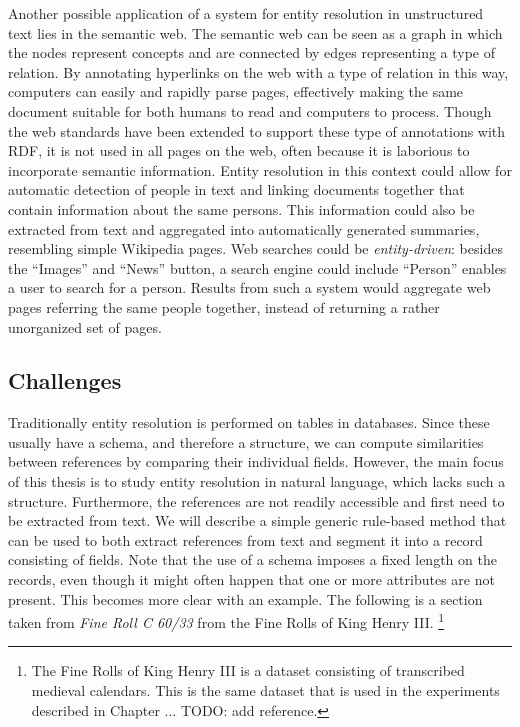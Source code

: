 Another possible application of a system for entity resolution in unstructured text lies in the semantic web.
The semantic web can be seen as a graph in which the nodes represent concepts and are connected by edges representing a type of relation.
By annotating hyperlinks on the web with a type of relation in this way, computers can easily and rapidly parse pages, effectively making the same document suitable for both humans to read and computers to process.
Though the web standards have been extended to support these type of annotations with RDF, it is not used in all pages on the web, often because it is laborious to incorporate semantic information.
Entity resolution in this context could allow for automatic detection of people in text and linking documents together that contain information about the same persons.
This information could also be extracted from text and aggregated into automatically generated summaries, resembling simple Wikipedia pages.
Web searches could be \emph{entity-driven}: besides the ``Images'' and ``News'' button, a search engine could include ``Person'' enables a user to search for a person.
Results from such a system would aggregate web pages referring the same people together, instead of returning a rather unorganized set of pages.




\subsection{Challenges}
\label{sec:challenges}

Traditionally entity resolution is performed on tables in databases.
Since these usually have a schema, and therefore a structure, we can compute similarities between references by comparing their individual fields.
However, the main focus of this thesis is to study entity resolution in natural language, which lacks such a structure.
Furthermore, the references are not readily accessible and first need to be extracted from text.
We will describe a simple generic rule-based method that can be used to both extract references from text and segment it into a record consisting of fields.
Note that the use of a schema imposes a fixed length on the records, even though it might often happen that one or more attributes are not present.
This becomes more clear with an example.
The following is a section taken from \emph{Fine Roll C 60/33} from the Fine Rolls of King Henry III. \footnote{The Fine Rolls of King Henry III is a dataset consisting of transcribed medieval calendars. This is the same dataset that is used in the experiments described in Chapter ... TODO: add reference.}

